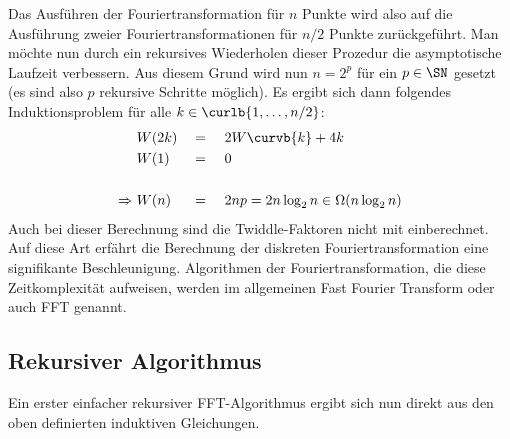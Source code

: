 		Das Ausführen der Fouriertransformation für $n$ Punkte wird also auf die Ausführung zweier Fouriertransformationen für $n/2$ Punkte zurückgeführt.
		Man möchte nun durch ein rekursives Wiederholen dieser Prozedur die asymptotische Laufzeit verbessern.
		Aus diesem Grund wird nun $n=2^p$ für ein $p\in\SN$ gesetzt (es sind also $p$ rekursive Schritte möglich).
		Es ergibt sich dann folgendes Induktionsproblem für alle $k\in\curlb{1,\ldots,n/2}$:
		\begin{alignat*}{3}
			&W(2k) &&=&& \ 2W\curvb{k} + 4k \\
			&W(1) &&=&& \ 0 \\
			\\
			\Rightarrow \ &W(n) &&=&& \ 2np = 2n\log_2n \in \Omega(n\log_2n)
		\end{alignat*}
		Auch bei dieser Berechnung sind die Twiddle-Faktoren nicht mit einberechnet.
		Auf diese Art erfährt die Berechnung der diskreten Fouriertransformation eine signifikante Beschleunigung.
		Algorithmen der Fouriertransformation, die diese Zeitkomplexität aufweisen, werden im allgemeinen Fast Fourier Transform oder auch FFT genannt.


	\subsection{Rekursiver Algorithmus} %
	\label{sub:rekursiver_algorithmus}
	
		Ein erster einfacher rekursiver FFT-Algorithmus ergibt sich nun direkt aus den oben definierten induktiven Gleichungen.



